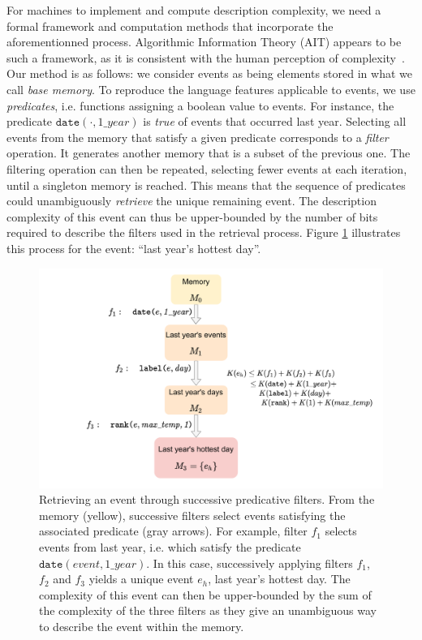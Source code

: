 \documentclass[entropy,article,submit,moreauthors,pdftex]{Definitions/mdpi}
\begin{document}
For machines to implement and compute description complexity, we need a formal framework and computation methods that incorporate the aforementionned process. Algorithmic Information Theory (AIT) appears to be such a framework, as it is consistent with the human perception of complexity~\cite{li_introduction_2008,dessalles_coincidences_2011,delahaye_numerical_2012}. Our method is as follows: we
consider events as being elements stored in what we call \emph{base memory}. To
reproduce the language features applicable to events, we use \emph
{predicates}, i.e. functions assigning a boolean value to events. For instance, the predicate $\mathtt{date}
(\cdot, 1\_year)$ is \emph{true} of events that occurred last year. Selecting
all events from the memory that satisfy a given predicate corresponds to
a \emph{filter} operation. It generates another memory that is a subset of the previous one.
The filtering operation can then be repeated, selecting
fewer events at each iteration, until a singleton memory is reached. This means that the sequence
of predicates could unambiguously \emph{retrieve} the unique remaining event.
The description complexity of this event can thus be upper-bounded by the
number of bits required to describe the filters used in the retrieval
process. Figure \ref{fig:filters} illustrates this process for the event: ``last year's hottest day''.

\begin{figure}[!ht]
    \centering
    \includegraphics[width=.95\linewidth]{figures/filters}
    \caption{Retrieving an event through successive predicative
        filters. From the memory (yellow), successive filters select events satisfying the associated predicate (gray arrows). For example,
        filter $f_1$ selects events from last year, i.e. which satisfy the
        predicate $\mathtt{date}(event, 1\_year)$. In this case, successively
        applying filters $f_1$, $f_2$ and $f_3$ yields a unique event $e_h$, last
        year's hottest day. The complexity of this event can then be upper-bounded
        by the sum of the complexity of the three filters as they give an unambiguous way
        to describe the event within the memory.}
    \label{fig:filters}
\end{figure}
\end{document}
